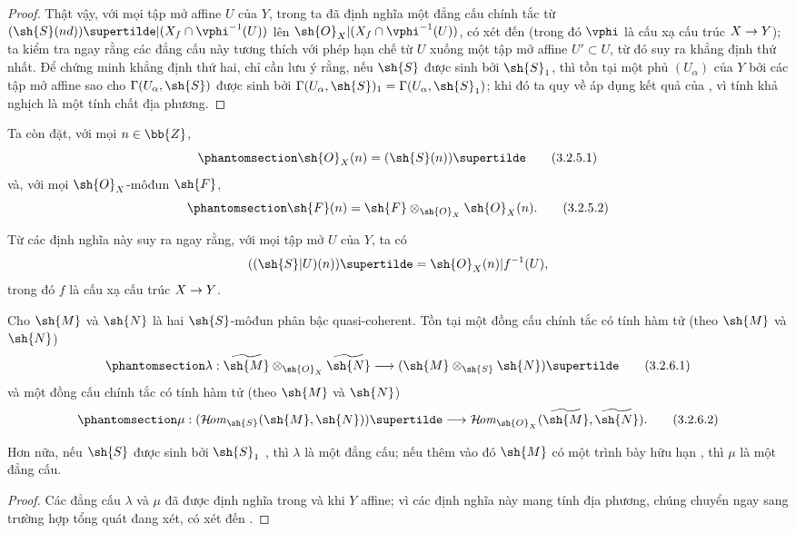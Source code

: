 \documentclass[oneside,10pt]{amsart}
\makeatletter
\newcommand{\ega@arrow}[2]{\mathchoice{#1}{#2}{#2}{#2}}
\renewcommand{\to}{\ega@arrow{\longrightarrow}{\rightarrow}}
\def\shHom{\mathcal{H}\!\mathit{om}}
\let\EGAOriginalLabel\label
\renewcommand{\label}[1]{\phantomsection\EGAOriginalLabel{#1}}
\makeatother
\begin{document}
\begin{proof}
Thật vậy, với mọi tập mở affine $U$ của $Y$, trong  ta đã định nghĩa một đẳng cấu chính tắc từ $(\sh{S}(nd))\supertilde|(X_f\cap\vphi^{-1}(U))$ lên $\sh{O}_X|(X_f\cap\vphi^{-1}(U))$, có xét đến  (trong đó $\vphi$ là cấu xạ cấu trúc $X\to Y$);
ta kiểm tra ngay rằng các đẳng cấu này tương thích với phép hạn chế từ $U$ xuống một tập mở affine $U'\subset U$, từ đó suy ra khẳng định thứ nhất.
Để chứng minh khẳng định thứ hai, chỉ cần lưu ý rằng, nếu $\sh{S}$ được sinh bởi $\sh{S}_1$, thì tồn tại một phủ $(U_\alpha)$ của $Y$ bởi các tập mở affine sao cho $\Gamma(U_\alpha,\sh{S})$ được sinh bởi $\Gamma(U_\alpha,\sh{S})_1=\Gamma(U_\alpha,\sh{S}_1)$;
khi đó ta quy về áp dụng kết quả của , vì tính khả nghịch là một tính chất địa phương.
\end{proof}

Ta còn đặt, với mọi $n\in\bb{Z}$,
\[
\label{II.3.2.5.1}
  \sh{O}_X(n)=(\sh{S}(n))\supertilde
\tag{3.2.5.1}
\]
và, với mọi $\sh{O}_X$-môđun $\sh{F}$,
\[
\label{II.3.2.5.2}
  \sh{F}(n)=\sh{F}\otimes_{\sh{O}_X}\sh{O}_X(n).
\tag{3.2.5.2}
\]

Từ các định nghĩa này suy ra ngay rằng, với mọi tập mở $U$ của $Y$, ta có
\[
  ((\sh{S}|U)(n))\supertilde=\sh{O}_X(n)|f^{-1}(U),
\]
trong đó $f$ là cấu xạ cấu trúc $X\to Y$.

\begin{proposition}[3.2.6]
\label{II.3.2.6}
Cho $\sh{M}$ và $\sh{N}$ là hai $\sh{S}$-môđun phân bậc quasi-coherent.
Tồn tại một đồng cấu chính tắc có tính hàm tử (theo $\sh{M}$ và $\sh{N}$)
\[
\label{II.3.2.6.1}
  \lambda:\widetilde{\sh{M}}\otimes_{\sh{O}_X}\widetilde{\sh{N}}\to(\sh{M}\otimes_{\sh{S}}\sh{N})\supertilde
\tag{3.2.6.1}
\]
và một đồng cấu chính tắc có tính hàm tử (theo $\sh{M}$ và $\sh{N}$)
\[
\label{II.3.2.6.2}
  \mu:(\shHom_{\sh{S}}(\sh{M},\sh{N}))\supertilde\to\shHom_{\sh{O}_X}(\widetilde{\sh{M}},\widetilde{\sh{N}}).
\tag{3.2.6.2}
\]

Hơn nữa, nếu $\sh{S}$ được sinh bởi $\sh{S}_1$ , thì $\lambda$ là một đẳng cấu;
nếu thêm vào đó $\sh{M}$ có một trình bày hữu hạn , thì $\mu$ là một đẳng cấu.
\end{proposition}

\begin{proof}
Các đẳng cấu $\lambda$ và $\mu$ đã được định nghĩa trong  và  khi $Y$ affine;
vì các định nghĩa này mang tính địa phương, chúng chuyển ngay sang trường hợp tổng quát đang xét, có xét đến .
\end{proof}
\end{document}
